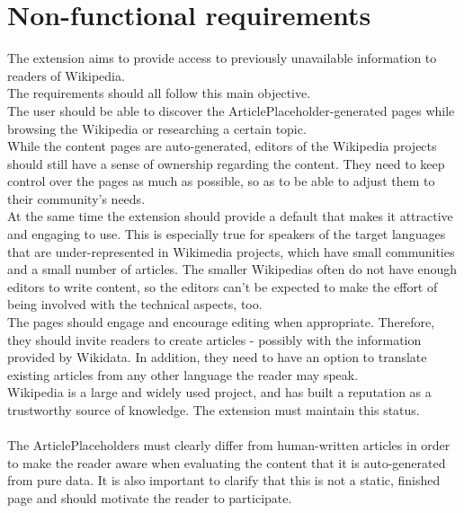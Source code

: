 \chapter{Non-functional requirements}

The extension aims to provide access to previously unavailable information to readers of Wikipedia. \\
The requirements should all follow this main objective. \\
The user should be able to discover the ArticlePlaceholder-generated pages while browsing the Wikipedia or researching a certain topic. \\
While the content pages are auto-generated, editors of the Wikipedia projects should still have a sense of ownership regarding the content. They need to keep control over the pages as much as possible, so as to be able to adjust them to their community's needs. \\
At the same time the extension should provide a default that makes it attractive and engaging to use. This is especially true for speakers of the target languages that are under-represented in Wikimedia projects, which have small communities and a small number of articles. The smaller Wikipedias often do not have enough editors to write content, so the editors can't be expected to make the effort of being involved with the technical aspects, too.  \\
The pages should engage and encourage editing when appropriate. Therefore, they should invite readers to create articles - possibly with the information provided by Wikidata. In addition, they need to have an option to translate existing articles from any other language the reader may speak. \\
Wikipedia is a large and widely used project, and has built a reputation as a trustworthy source of knowledge. The extension must maintain this status. \\
\\
The ArticlePlaceholders must clearly differ from human-written articles in order to make the reader aware when evaluating the content that it is auto-generated from pure data. It is also important to clarify that this is not a static, finished page and should motivate the reader to participate. \\